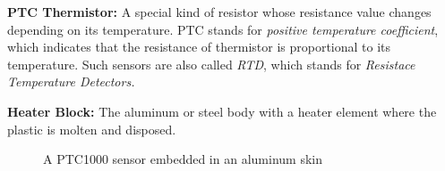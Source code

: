 \textbf{PTC Thermistor:} A special kind of resistor whose resistance value changes depending on its temperature. PTC stands for \textit{positive
temperature coefficient}, which indicates that the resistance of thermistor is proportional to its temperature. Such sensors are also called \textit{RTD}, which stands for \textit{Resistace Temperature Detectors.}

\textbf{Heater Block:} The aluminum or steel body with a heater element where the plastic is molten and disposed.

\begin{figure}[H]
    \centering
    \begin{minipage}{0.45\textwidth}
        \centering
        \caption{A PTC1000 sensor embedded in an aluminum skin \cite{pt100}}
    \end{minipage}
    \begin{minipage}{0.45\textwidth}
        \centering

\end{minipage}
\end{figure}
